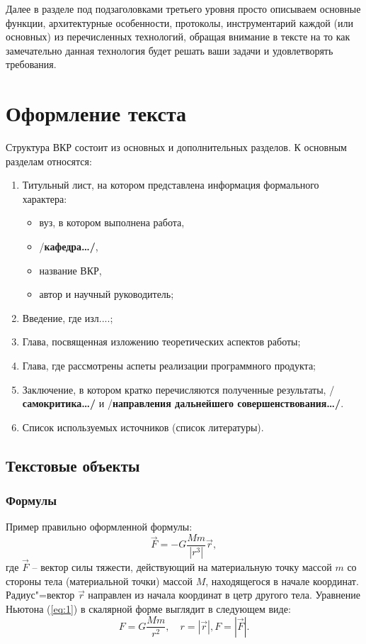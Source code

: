 \documentclass[a4paper,14pt,final]{extreport}
\newcommand{\aaa}[1]{{/\bfseries #1\ldots/}}
\begin{document}
Далее в разделе под подзаголовками третьего уровня просто описываем основные функции, архитектурные особенности, протоколы, инструментарий каждой (или основных) из перечисленных технологий, обращая внимание в тексте на то как замечательно данная технология будет решать ваши задачи и удовлетворять требования.

\chapter{Оформление текста}
\label{cha:layout}

Структура ВКР состоит из основных и дополнительных разделов.  К основным разделам относятся:
\begin{enumerate}
\item Титульный лист, на котором представлена информация формального характера:
  \begin{itemize}
  \item вуз, в котором выполнена работа,
  \item \aaa{кафедра},
  \item название ВКР,
  \item автор и научный руководитель;
  \end{itemize}
\item Введение, где изл....;
\item Глава, посвященная изложению теоретических аспектов работы;
\item Глава, где рассмотрены аспеты реализации программного продукта;
\item Заключение, в котором кратко перечисляются полученные результаты, \aaa{самокритика} и \aaa{направления дальнейшего совершенствования}.
\item Список используемых источников (список литературы).
\end{enumerate}

\section{Текстовые объекты}
\label{sec:objs}

\subsection{Формулы}
\label{sec:formulae}

Пример правильно оформленной формулы:
\begin{equation}
  \label{eq:1}
  \vec{F} = -G\frac{Mm}{|r^3|}\vec{r},
\end{equation}
где $\vec{F}$ -- вектор силы тяжести, действующий на материальную точку массой $m$ со стороны тела (материальной точки) массой $M$, находящегося в начале координат.  Радиус"=вектор $\vec{r}$ направлен из начала координат в цетр другого тела.  Уравнение Ньютона (\ref{eq:1}) в скалярной форме выглядит в следующем виде:
\begin{equation*}
  F=G\frac{Mm}{r^2},\quad r=|\vec{r}|, F=|\vec{F}|.
\end{equation*}
\end{document}
